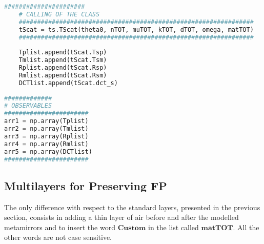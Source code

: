 \documentclass[aps,prl,10pt,onecolumn,superscriptaddress]{revtex4-2}
\begin{document}
\begin{lstlisting}[language=Python, caption=Layers of a standard FP.]
    ######################
    # CALLING OF THE CLASS
    ################################################################
    tScat = ts.TScat(theta0, nTOT, muTOT, kTOT, dTOT, omega, matTOT)  
    ################################################################
    
    Tplist.append(tScat.Tsp)
    Tmlist.append(tScat.Tsm)
    Rplist.append(tScat.Rsp)
    Rmlist.append(tScat.Rsm)
    DCTlist.append(tScat.dct_s)
    
#############
# OBSERVABLES
#######################    
arr1 = np.array(Tplist)
arr2 = np.array(Tmlist)
arr3 = np.array(Rplist)
arr4 = np.array(Rmlist)
arr5 = np.array(DCTlist)
#######################
\end{lstlisting}
\subsection{Multilayers for Preserving FP}
The only difference with respect to the standard layers, presented in the previous section, consists in adding a thin layer of air before and after the modelled metamirrors and to insert the word $\mathbf{Custom}$ in the list called $\mathbf{matTOT}$. All the other words are not case sensitive.
\end{document}
